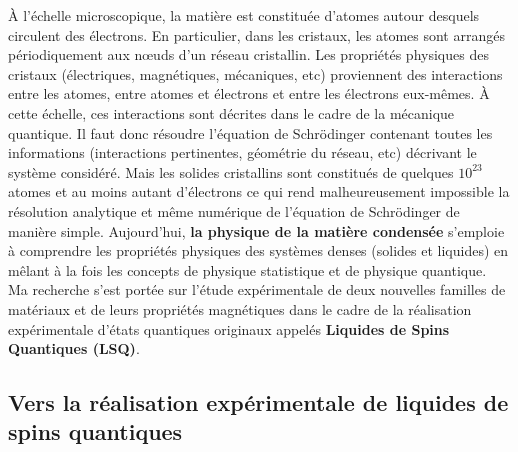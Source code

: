 \vspace{2mm}
\`{A} l'échelle microscopique, la matière est constituée d'atomes autour desquels circulent des électrons. En particulier, dans les cristaux, les atomes sont arrangés périodiquement aux n\oe uds d'un réseau cristallin. Les propriétés physiques des cristaux (électriques, magnétiques, mécaniques, etc) proviennent des interactions entre les atomes, entre atomes et électrons et entre les électrons eux-mêmes. \`{A} cette échelle, ces interactions sont décrites dans le cadre de la mécanique quantique. Il faut donc résoudre l'équation de Schrödinger contenant toutes les informations (interactions pertinentes, géométrie du réseau, etc) décrivant le système considéré. Mais les solides cristallins sont constitués de quelques $10^{23}$ atomes et au moins autant d'électrons ce qui rend malheureusement impossible la résolution analytique et même numérique de l'équation de Schrödinger de manière simple. Aujourd'hui, \textbf{la physique de la matière condensée} s'emploie à comprendre les propriétés physiques des systèmes denses (solides et liquides) en mêlant à la fois les concepts de physique statistique et de physique quantique.\\
Ma recherche s'est portée sur l'étude expérimentale de deux nouvelles familles de matériaux et de leurs propriétés magnétiques dans le cadre de la réalisation expérimentale d'états quantiques originaux appelés \textbf{Liquides de Spins Quantiques (LSQ)}.
\subsection{Vers la réalisation expérimentale de liquides de spins quantiques}
